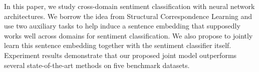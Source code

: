 In this paper, we study cross-domain sentiment classification with neural network architectures. We borrow the idea from Structural Correspondence Learning and use two auxiliary tasks to help induce a sentence embedding that supposedly works well across domains for sentiment classification. We also propose to jointly learn this sentence embedding together with the sentiment classifier itself. Experiment results demonstrate that our proposed joint model outperforms several state-of-the-art methods on five benchmark datasets.
